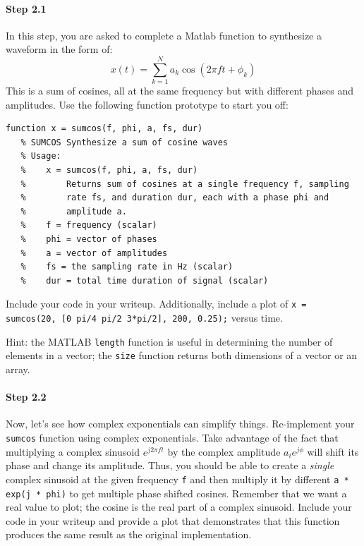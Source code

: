 \paragraph{Step 2.1} In this step, you are asked to complete a Matlab
function to synthesize a waveform in the form of:
\begin{equation*}
x(t) = \sum_{k=1}^N a_k\cos(2\pi f t + \phi_k)
\end{equation*}
This is a sum of cosines, all at the same frequency but with different
phases and amplitudes.  Use the following function prototype to start you off:
\begin{lstlisting}[style=Matlab-editor,basicstyle=\mlttfamily\small]
   function x = sumcos(f, phi, a, fs, dur)
   % SUMCOS Synthesize a sum of cosine waves
   % Usage:
   %    x = sumcos(f, phi, a, fs, dur)
   %        Returns sum of cosines at a single frequency f, sampling
   %        rate fs, and duration dur, each with a phase phi and
   %        amplitude a.
   %    f = frequency (scalar)
   %    phi = vector of phases
   %    a = vector of amplitudes
   %    fs = the sampling rate in Hz (scalar)
   %    dur = total time duration of signal (scalar)
\end{lstlisting}


Include your code in your writeup. Additionally, include a plot of
\texttt{x = sumcos(20, [0 pi/4 pi/2 3*pi/2], 200, 0.25);} versus
time.

Hint: the MATLAB \verb|length| function is useful in determining the
number of elements in a vector; the \verb|size| function returns both
dimensions of a vector or an array.


\paragraph{Step 2.2} Now, let's see how complex exponentials can
simplify things. Re-implement your \texttt{sumcos} function using
complex exponentials. Take advantage of the fact that multiplying a
complex sinusoid $e^{j2\pi f t}$ by the complex amplitude
$a_ie^{j\phi}$ will shift its phase and change its amplitude. Thus,
you should be able to create a \emph{single} complex sinusoid at the
given frequency \texttt{f} and then multiply it by different \texttt{a
  * exp(j * phi)} to get multiple phase shifted cosines. Remember that
we want a real value to plot; the cosine is the real part of a complex
sinusoid. Include your code in your writeup and provide a plot that
demonstrates that this function produces the same result as the
original implementation.


